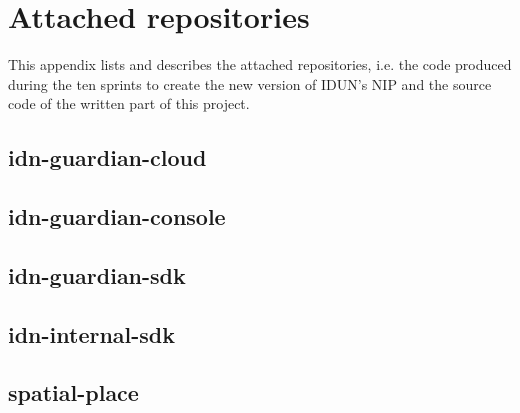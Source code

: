 \chapter{Attached repositories}
\label{appendix6-attached-repositories}

This appendix lists and describes the attached repositories, i.e. the code produced during the ten sprints to create the new version of IDUN's NIP and the source code of the written part of this project.

\section*{idn-guardian-cloud}

\section*{idn-guardian-console}

\section*{idn-guardian-sdk}

\section*{idn-internal-sdk}

\section*{spatial-place}
